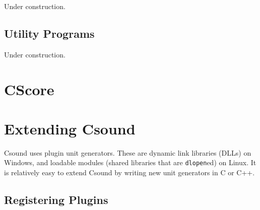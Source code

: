 \documentclass[10pt,letterpaper,onecolumn]{book}
\begin{document}
Under construction.

\section{Utility Programs}

Under construction.

\chapter{CScore}






\chapter{Extending Csound}

Csound uses plugin unit generators. These are dynamic link libraries (DLLs) on Windows, and loadable modules (shared libraries that are \texttt{dlopen}ed) on Linux. It is relatively easy to extend Csound by writing new unit generators in C or C++.





\section{Registering Plugins}
\end{document}
